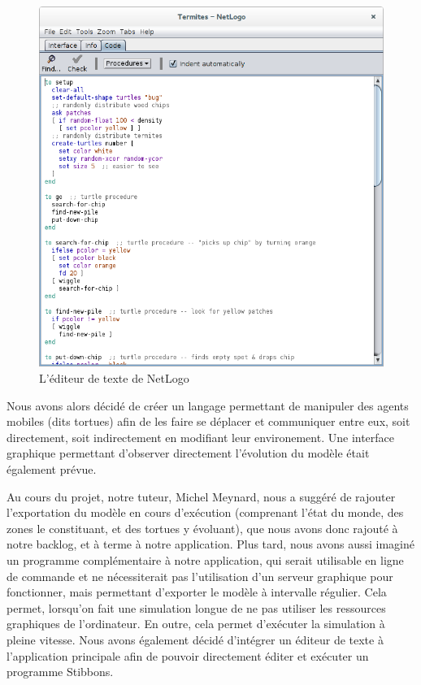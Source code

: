 \begin{figure}[h]
\centering
\includegraphics[scale=0.3]{doc/gestionProjet/netlogo-code.png}
\caption{\label{netlogo-code} L'éditeur de texte de NetLogo}
\end{figure}


Nous avons alors décidé de créer un langage permettant de manipuler des agents mobiles (dits tortues) afin de les faire se déplacer et communiquer entre eux, soit directement, soit indirectement en modifiant leur environement. Une interface graphique permettant d'observer directement l'évolution du modèle était également prévue.

Au cours du projet, notre tuteur, Michel Meynard, nous a suggéré de rajouter l'exportation du modèle en cours d'exécution (comprenant l'état du monde, des zones le constituant, et des tortues y évoluant), que nous avons donc rajouté à notre backlog, et à terme à notre application.
Plus tard, nous avons aussi imaginé un programme complémentaire à notre application, qui serait utilisable en ligne de commande et ne nécessiterait pas l'utilisation d'un serveur graphique pour fonctionner, mais permettant d'exporter le modèle à intervalle régulier.
Cela permet, lorsqu'on fait une simulation longue de ne pas utiliser les ressources graphiques de l'ordinateur. En outre, cela permet d'exécuter la simulation à pleine vitesse.
Nous avons également décidé d'intégrer un éditeur de texte à l'application principale afin de pouvoir directement éditer et exécuter un programme Stibbons.
